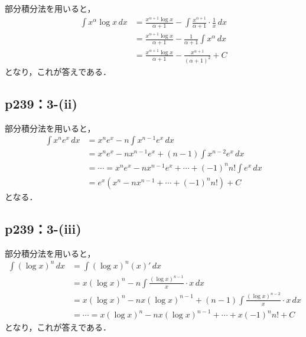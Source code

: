 \documentclass[a4paper,10pt,fleqn]{ltjsarticle}
\begin{document}
\begin{tleftbar}
    部分積分法を用いると，
    \begin{align*}
        \int x^\alpha \log x \, dx & = \frac{x^{\alpha +1} \log x}{\alpha +1}　- \int \frac{x^{\alpha +1}}{\alpha+1} \cdot \frac{1}{x} \, dx \\
        & = \frac{x^{\alpha +1} \log x}{\alpha +1}- \frac{1}{\alpha +1} \int x^{\alpha} \, dx \\
        & = \frac{x^{\alpha+1} \log x}{\alpha +1} - \frac{x^{\alpha +1}}{(\alpha +1)^2}+ C
    \end{align*}
    となり，これが答えである．
\end{tleftbar}

\subsection*{p239：3-(ii)}

\begin{tleftbar}
    部分積分法を用いると，
    \begin{align*}
        \int x^n e^x \, dx & = x^n e^x - n \int x^{n-1} e^x \, dx \\
        & = x^n e^x - n x^{n-1} e^x + (n-1)\int x^{n-2} e^x \, dx \\
        & = \cdots = x^n e^x - n x^{n-1} e^x + \cdots + (-1)^n n! \int e^x \, dx \\
        & = e^x (x^n -n x^{n-1}+ \cdots +(-1)^n n!) + C
    \end{align*}
    となる．
\end{tleftbar}

\subsection*{p239：3-(iii)}

\begin{tleftbar}
    部分積分法を用いると，
    \begin{align*}
        \int (\log x)^n \, dx & = \int (\log x)^n  (x)' \, dx \\
        & = x (\log x)^n - n \int  \frac{(\log x)^{n-1}}{x} \cdot  x \, dx \\
        & =  x (\log x)^n - n x(\log x)^{n-1} + (n-1) \int \frac{(\log x)^{n-2}}{x} \cdot x \, dx \\
        & = \cdots = x (\log x)^n - n x(\log x)^{n-1} + \cdots + x(-1)^n n!+C
    \end{align*}
    となり，これが答えである．
\end{tleftbar}
\end{document}
